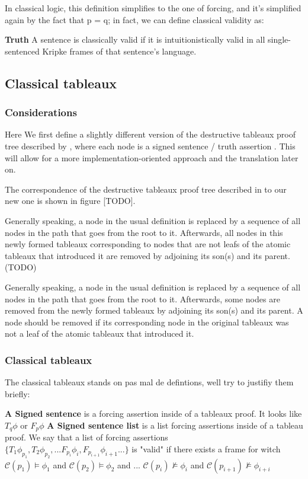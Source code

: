 \documentclass[runningheads]{llncs}
\begin{document}
In classical logic, this definition simplifies to the one of forcing, and it's simplified again by the fact that p = q; in fact, we can define classical validity as: \cite{book1}

\begin{definition}
    \textbf{Truth}
    A sentence is classically valid if it is intuitionistically valid in all single-sentenced Kripke frames of that sentence's language. 
\end{definition}

\subsection{Classical tableaux}

\subsubsection{Considerations}
    Here We first define a slightly different version of the destructive tableaux proof tree described by \cite{book1}, where each node is a signed sentence  / truth assertion . This will allow for a more implementation-oriented approach and the translation later on. 
    
    The correspondence of the destructive tableaux proof tree described in \cite{book1} to our new one is shown in figure [TODO].
    
    Generally speaking,
    a node in the usual definition is replaced by a sequence of 
    all nodes in the path that goes from the root to it. Afterwards, all nodes in this newly formed tableaux corresponding to nodes that are not leafs of the atomic tableaux that introduced it are removed by adjoining its son(s) and its parent.  (TODO)

    Generally speaking,
    a node in the usual definition is replaced by a sequence of 
    all nodes in the path that goes from the root to it. Afterwards, some nodes are removed from the newly formed tableaux by adjoining its son(s) and its parent. A node should be removed if its corresponding node in the original tableaux was not a leaf of the atomic tableaux that introduced it.   


\subsubsection{Classical tableaux}
The classical tableaux stands on pas mal de defintions, well try to justifiy them briefly:
\begin{definition}
    \textbf{A Signed sentence} is a forcing assertion inside of a tableaux proof. It looks like $T_{q} \phi $ or $F_{p} \phi $ 
    \textbf{A Signed sentence list} is a list forcing assertions inside of a tableau proof. We say that a list of forcing assertions \\$\{ T_{1}\phi_{p_1}, T_{2}\phi_{p_2}, ... F_{p_i}\phi_{i}, F_{p_{i+1}}\phi_{i+1}...\} $
     is "valid" if there exists a frame for witch $ \mathcal{C}(p_1) \vDash \phi_{1}$ and $ \mathcal{C}(p_{2}) \vDash \phi_{2}$ and ... $ \mathcal{C}(p_{i}) \nvDash \phi_{i}$  and $ \mathcal{C}(p_{i+1}) \nvDash \phi_{i+i}$
\end{definition}
 
\end{document}
